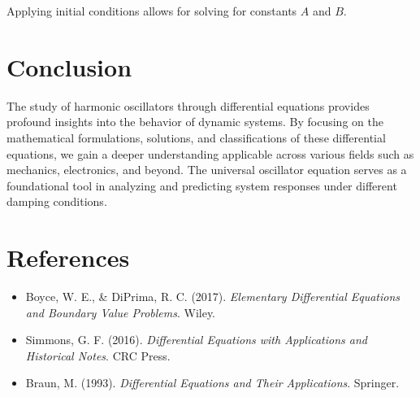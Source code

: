 \documentclass[12pt,a4paper]{article}
\begin{document}
Applying initial conditions allows for solving for constants \( A \) and \( B \).

\section{Conclusion}

The study of harmonic oscillators through differential equations provides profound insights into the behavior of dynamic systems. By focusing on the mathematical formulations, solutions, and classifications of these differential equations, we gain a deeper understanding applicable across various fields such as mechanics, electronics, and beyond. The universal oscillator equation serves as a foundational tool in analyzing and predicting system responses under different damping conditions.

\section{References}

\begin{itemize}
    \item Boyce, W. E., \& DiPrima, R. C. (2017). \textit{Elementary Differential Equations and Boundary Value Problems}. Wiley.
    \item Simmons, G. F. (2016). \textit{Differential Equations with Applications and Historical Notes}. CRC Press.
    \item Braun, M. (1993). \textit{Differential Equations and Their Applications}. Springer.
\end{itemize}
\end{document}
